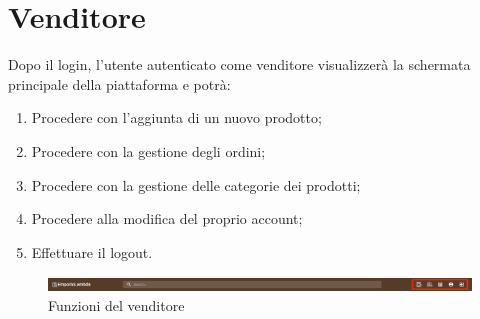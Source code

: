 \newpage
\section{Venditore}\label{Venditore}
Dopo il login, l'utente autenticato come venditore visualizzerà la schermata principale della piattaforma e potrà:
\begin{enumerate}
	\item Procedere con l'aggiunta di un nuovo prodotto;
	\item Procedere con la gestione degli ordini;
	\item Procedere con la gestione delle categorie dei prodotti;
	\item Procedere alla modifica del proprio account;
	\item Effettuare il logout.
\end{enumerate}
\begin{figure}[H]
	\centering
	\includegraphics[scale=0.4]{Immagini/Venditore/Header.png}
	\caption{Funzioni del venditore}
	\label{fig:FunzioniVenditore}
\end{figure}
